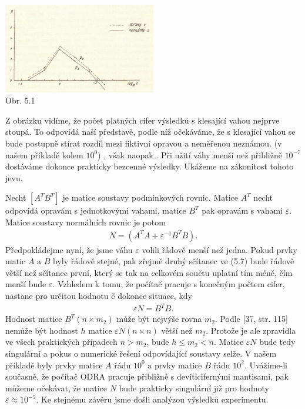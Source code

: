 \begin{center}
\includegraphics[width=0.5\textwidth]{obr_5.1.png}\\
Obr. 5.1
\end{center}

\noindent
Z obrázku vidíme, že počet platných cifer výsledků s klesající
vahou nejprve stoupá. To odpovídá naší představě, podle níž
očekáváme, že s klesající vahou se bude postupně stírat rozdíl mezi
fiktivní opravou a neměřenou neznámou.
(v našem příkladě kolem $10^0$) , však naopak
.
Při užití váhy menší než přibližně $10^{-7}$ dostáváme dokonce
prakticky bezcenné výsledky. Ukážeme na zákonitost tohoto jevu.


Nechť $[A^T B^T]$ je matice soustavy podmínkových rovnic. Matice $A^T$
nechť odpovídá opravám s jednotkovými vahami, matice $B^T$ pak opravám
s vahami $\varepsilon$. Matice soustavy normálních rovnic je potom
%
\begin{align*}
\tag{5.7}
        N = (A^TA + \varepsilon^{-1}B^TB).
\end{align*} 
%
Předpokládejme nyní, že jsme váhu $\varepsilon$ volili řádově menší
než jedna. Pokud prvky matic $A$ a $B$ byly řádově stejné, pak zřejmě
druhý sčítanec ve (5.7) bude řádově větší než sčítanec první, který se
tak na celkovém součtu uplatní tím méně, čím menší bude
$\varepsilon$. Vzhledem k tomu, že počítač pracuje s konečným počtem
cifer, nastane pro určitou hodnotu č dokonce situace, kdy
%
\begin{align*}
\tag{5.8}
        \varepsilon N = B^TB.
\end{align*}
%
Hodnost matice $B^T(n \times m_2)$ může být nejvýše rovna $m_2$.  Podle
[37, str. 115] nemůže být hodnost $h$ matice $\varepsilon N(n \times
n)$ větší než $m_2$.  Protože je ale zpravidla ve všech praktických
případech $n > m_2$, bude $h \le m_2 < n$.  Matice $\varepsilon N$
bude tedy singulární a pokus o numerické řešení odpovídající soustavy
selže. V našem příkladě byly prvky matice $A$ řádu $10^0$ a prvky
matice $B$ řádu $10^2$. Uvážíme-li současně, že počítač ODRA pracuje
přibližně s devíticifernými mantisami, pak můžeme očekávat, že matice
$N$ bude prakticky singulární již pro hodnoty $\varepsilon \approx
10^{-5}$. Ke stejnému závěru jsme došli analýzou výsledků experimentu.

